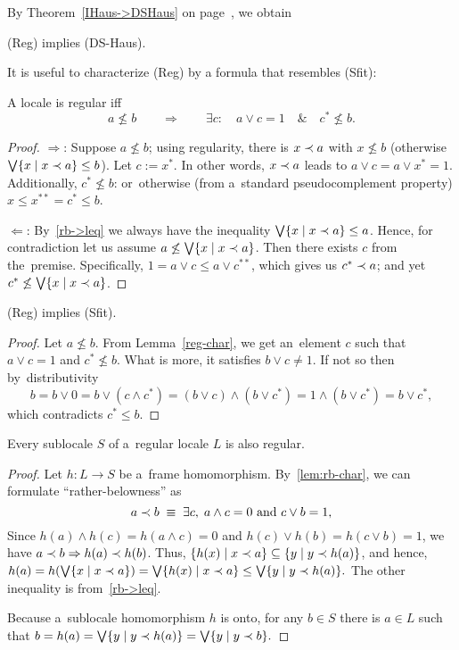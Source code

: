 By Theorem~\ref{IHaus->DSHaus} on page~\pageref{IHaus->DSHaus}\thinspace, we
obtain
\begin{cor}
  (Reg) implies (DS-Haus).
\end{cor}

It is useful to characterize (Reg) by a formula that resembles (Sfit):
\begin{lem} \label{reg-char}
  A locale is regular iff
  \[
    a \not\le b \qquad \Rightarrow \qquad \exists c: \quad a \vee c = 1 \quad
    \& \quad c^* \not\leq b.
  \]
\end{lem}
\begin{proof}
  $\Rightarrow$:
  Suppose $a \not\le b$;
  using regularity, there is $x \prec a$ with $x \not\le b$ (otherwise $\bigvee
  \{x \mid x \prec a\} \le b$).
  Let $c := x^*$.
  In other words, $x \prec a$ leads to $a \vee c = a \vee x^* = 1$.
  Additionally, $c^* \not\le b$:
  or~otherwise (from a~standard pseudocomplement property) $x \le x^{**} = c^*
  \le b$.

  $\Leftarrow$:
  By~\ref{rb->leq} we always have the inequality $\bigvee \{x \mid x \prec a\} \le
  a$.
  Hence, for contradiction let us assume $a \not\le \bigvee \{x \mid x \prec a\}$.
  Then there exists $c$ from the~premise.
  Specifically, $1 = a \vee c \le a \vee c^{**}$, which gives us $c^* \prec a$;
  and yet $c^* \not\le \bigvee \{x \mid x \prec a\}$.
\end{proof}

\begin{thm} \label{thm:reg->sfit}
  (Reg) implies (Sfit).
\end{thm}
\begin{proof}
  Let $a \not\le b$.
  From Lemma~\ref{reg-char}\thinspace, we get an~element $c$ such that $a \vee
  c = 1$ and $c^* \not\le b$.
  What is more, it satisfies $b \vee c \ne 1$.
  If not so then by~distributivity
  \[
    b = b \vee 0 = b \vee (c \wedge c^*) = (b \vee c) \wedge (b \vee c^*) = 1
    \wedge (b \vee c^*) = b \vee c^*,
  \]
  which contradicts $c^* \le b$.
\end{proof}

\begin{prop} \label{prop:sloc-of-reg}
  Every sublocale $S$ of a~regular locale $L$ is also regular.
\end{prop}
\begin{proof}
  Let $h\colon L \to S$ be a~frame homomorphism.
  By~\ref{lem:rb-char}, we can formulate ``rather-belowness'' as
  \[
    a \prec b 
    \; \equiv \;
    \exists c, \; a \wedge c = 0 \text{ and } c \vee b = 1,
  \]
  Since $h(a) \wedge h(c) = h(a \wedge c) = 0$ and $h(c) \vee h(b) = h(c \vee
  b) = 1$, we have $a \prec b \Rightarrow h(a) \prec h(b)$.
  Thus, $\{ h(x) \mid x \prec a\} \subseteq \{ y \mid y \prec h(a)\}$, and hence,
  $
    h(a)
    = h (\bigvee \{ x \mid x \prec a\})
    = \bigvee \{ h(x) \mid x \prec a\}
    \le \bigvee \{ y \mid y \prec h(a) \}.
  $
  The other inequality is from~\ref{rb->leq}.

  Because a~sublocale homomorphism $h$ is onto, for any $b\in S$ there is $a\in
  L$ such that
  $
    b
    = h(a)
    = \bigvee \{ y \mid y \prec h(a) \}
    = \bigvee \{ y \mid y \prec b \}.
  $
\end{proof}

